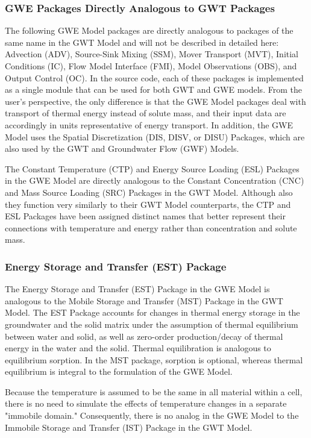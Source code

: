 \subsubsection{GWE Packages Directly Analogous to GWT Packages}

The following GWE Model packages are directly analogous to packages of the same name in the GWT Model and will not be described in detailed here: Advection (ADV), Source-Sink Mixing (SSM), Mover Transport (MVT), Initial Conditions (IC), Flow Model Interface (FMI), Model Observations (OBS), and Output Control (OC). In the \mf source code, each of these packages is implemented as a single module that can be used for both GWT and GWE models. From the user's perspective, the only difference is that the GWE Model packages deal with transport of thermal energy instead of solute mass, and their input data are accordingly in units representative of energy transport. In addition, the GWE Model uses the Spatial Discretization (DIS, DISV, or DISU) Packages, which are also used by the GWT and Groundwater Flow (GWF) Models.

The Constant Temperature (CTP) and Energy Source Loading (ESL) Packages in the GWE Model are directly analogous to the Constant Concentration (CNC) and Mass Source Loading (SRC) Packages in the GWT Model. Although also they function very similarly to their GWT Model counterparts, the CTP and ESL Packages have been assigned distinct names that better represent their connections with temperature and energy rather than concentration and solute mass.

\subsubsection{Energy Storage and Transfer (EST) Package}

The Energy Storage and Transfer (EST) Package in the GWE Model is analogous to the Mobile Storage and Transfer (MST) Package in the GWT Model. The EST Package accounts for changes in thermal energy storage in the groundwater and the solid matrix under the assumption of thermal equilibrium between water and solid, as well as zero-order production/decay of thermal energy in the water and the solid. Thermal equilibration is analogous to equilibrium sorption. In the MST package, sorption is optional, whereas thermal equilibrium is integral to the formulation of the GWE Model.

Because the temperature is assumed to be the same in all material within a cell, there is no need to simulate the effects of temperature changes in a separate "immobile domain." Consequently, there is no analog in the GWE Model to the Immobile Storage and Transfer (IST) Package in the GWT Model.

